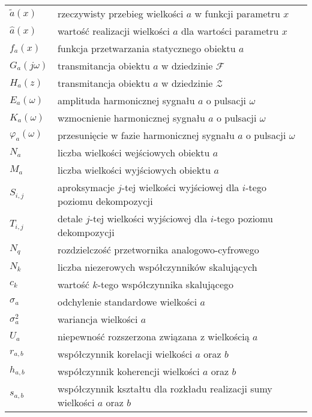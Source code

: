 \begin{longtable}[l]{ l @{~~--~~} p{376pt} }
$\tilde{a}(x)$                  & rzeczywisty przebieg wielkości $a$ w funkcji parametru $x$ \\
$\hat{a}(x)$                    & wartość realizacji wielkości $a$ dla wartości parametru $x$ \\
$f_{a}(x)$                      & funkcja przetwarzania statycznego obiektu $a$ \\
$G_{a}(j\omega)$                & transmitancja obiektu $a$ w dziedzinie $\mathcal{F}$ \\
$H_{a}(z)$                      & transmitancja obiektu $a$ w dziedzinie $\mathcal{Z}$ \\
$E_{a}(\omega)$                 & amplituda harmonicznej sygnału $a$ o pulsacji $\omega$ \\
$K_{a}(\omega)$                 & wzmocnienie harmonicznej sygnału $a$ o pulsacji $\omega$ \\
$\varphi_{a}(\omega)$           & przesunięcie w fazie harmonicznej sygnału $a$ o pulsacji $\omega$ \\
$N_{a}$                         & liczba wielkości wejściowych obiektu $a$ \\
$M_{a}$                         & liczba wielkości wyjściowych obiektu $a$ \\
$S_{i,j}$                       & aproksymacje $j$-tej wielkości wyjściowej dla $i$-tego poziomu dekompozycji \\
$T_{i,j}$                       & detale $j$-tej wielkości wyjściowej dla $i$-tego poziomu dekompozycji \\
$N_{q}$                         & rozdzielczość przetwornika analogowo-cyfrowego \\
$N_{k}$                         & liczba niezerowych współczynników skalujących \\
$c_{k}$                         & wartość $k$-tego współczynnika skalującego \\
$\sigma_{a}$                    & odchylenie standardowe wielkości $a$ \\
$\sigma_{a}^{2}$                & wariancja wielkości $a$ \\
$U_{a}$                         & niepewność rozszerzona związana z wielkością $a$ \\
$r_{a,b}$                       & współczynnik korelacji wielkości $a$ oraz $b$ \\
$h_{a,b}$                       & współczynnik koherencji wielkości $a$ oraz $b$ \\
$s_{a,b}$                       & współczynnik kształtu dla rozkładu realizacji sumy wielkości $a$ oraz $b$ \\

\end{longtable}
